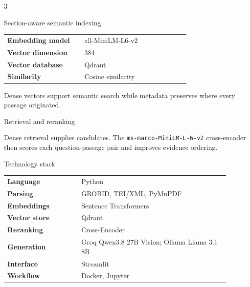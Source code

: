 \documentclass[a0,portrait]{a0poster}
\begin{document}
\begin{multicols}{3}
\begin{posterbox}{Section-aware semantic indexing}
\begin{center}
\renewcommand{\arraystretch}{1.3}
\begin{tabular}{>{\bfseries}p{0.38\linewidth}p{0.52\linewidth}}
Embedding model & all-MiniLM-L6-v2 \\
Vector dimension & 384 \\
Vector database & Qdrant \\
Similarity & Cosine similarity \\
\end{tabular}
\end{center}

Dense vectors support semantic search while metadata preserves where every
passage originated.
\end{posterbox}

\begin{posterbox}{Retrieval and reranking}
\begin{center}
\end{center}

Dense retrieval supplies candidates. The
\texttt{ms-marco-MiniLM-L-6-v2} cross-encoder then scores each
question-passage pair and improves evidence ordering.
\end{posterbox}

\begin{posterbox}{Technology stack}
\begin{center}
\renewcommand{\arraystretch}{1.45}
\begin{tabular}{p{0.30\linewidth}p{0.60\linewidth}}
\textbf{Language} & Python \\
\textbf{Parsing} & GROBID, TEI/XML, PyMuPDF \\
\textbf{Embeddings} & Sentence Transformers \\
\textbf{Vector store} & Qdrant \\
\textbf{Reranking} & Cross-Encoder \\
\textbf{Generation} & Groq Qwen3.8 27B Vision; Ollama Llama 3.1 8B \\
\textbf{Interface} & Streamlit \\
\textbf{Workflow} & Docker, Jupyter \\
\end{tabular}
\end{center}
\end{posterbox}


\end{multicols}
\end{document}
